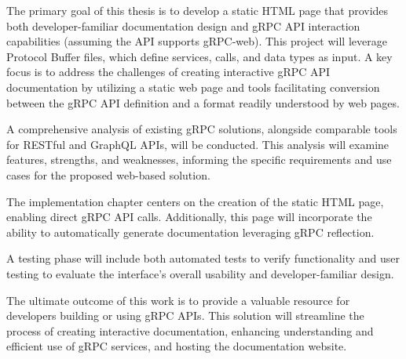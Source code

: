 %
%
%
%

The primary goal of this thesis is to develop a static HTML page that provides both developer-familiar documentation design and gRPC API interaction capabilities (assuming the API supports gRPC-web).
This project will leverage Protocol Buffer files, which define services, calls, and data types as input.
A key focus is to address the challenges of creating interactive gRPC API documentation by utilizing a static web page and tools facilitating conversion between the gRPC API definition and a format readily understood by web pages.

A comprehensive analysis of existing gRPC solutions, alongside comparable tools for RESTful and GraphQL APIs, will be conducted.
This analysis will examine features, strengths, and weaknesses, informing the specific requirements and use cases for the proposed web-based solution.

The implementation chapter centers on the creation of the static HTML page, enabling direct gRPC API calls.
Additionally, this page will incorporate the ability to automatically generate documentation leveraging gRPC reflection.

A testing phase will include both automated tests to verify functionality and user testing to evaluate the interface's overall usability and developer-familiar design.

The ultimate outcome of this work is to provide a valuable resource for developers building or using gRPC APIs.
This solution will streamline the process of creating interactive documentation, enhancing understanding and efficient use of gRPC services, and hosting the documentation website.